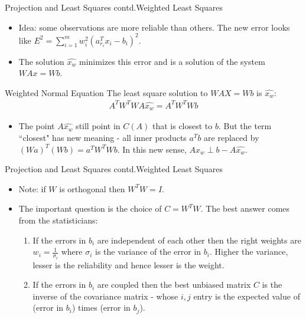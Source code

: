 \documentclass{beamer}
\begin{document}
\begin{frame}{Projection and Least Squares contd.}{Weighted Least Squares}
\begin{itemize}
    \item Idea: some observations are more reliable than others. The new error looks like $E^2 = \sum_{i=1}^{m}w_i^2(a_{r_i}^Tx_i-b_i)^2$.
    \item The solution $\hat{x_w}$ minimizes this error and is a solution of the system $WAx = Wb$.
\end{itemize}
\begin{exampleblock}{Weighted Normal Equation}
The least square solution to $WAX = Wb$ is $\hat{x_w}$:
\begin{align*}
    A^TW^TWA\hat{x_w} = A^TW^TWb
\end{align*}
\end{exampleblock}
\begin{itemize}
    \item The point $A\hat{x_w}$ still point in $C(A)$ that is closest to $b$. But the term ``closest" has new meaning - all inner products $a^Tb$ are replaced by $(Wa)^T(Wb) = a^TW^TWb$. In this new sense, $A\hat{x_w} \perp b - A\hat{x_w}$.
\end{itemize}
\end{frame}

\begin{frame}{Projection and Least Squares contd.}{Weighted Least Squares}
\begin{itemize}
\item Note: if $W$ is orthogonal then $W^TW = I$.
\item The important question is the choice of $C = W^TW$. The best answer comes from the statisticians:
\begin{enumerate}
    \item If the errors in $b_i$ are independent of each other then the right weights are $w_i = \frac{1}{\sigma_i}$ where $\sigma_i$ is the variance of the error in $b_i$. Higher the variance, lesser is the reliability and hence lesser is the weight.
    \item If the errors in $b_i$ are coupled then the best unbiased matrix $C$ is the inverse of the covariance matrix - whose $i,j$ entry is the expected value of (error in $b_i$) times (error in $b_j$).
\end{enumerate}
\end{itemize}
\end{frame}

\end{document}
